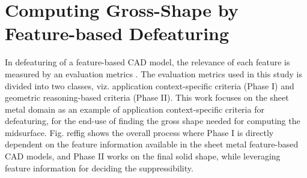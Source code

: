 \section{Computing Gross-Shape by Feature-based Defeaturing} \label{defeat}

In defeaturing of a feature-based CAD model, the relevance of each feature is measured by an evaluation metrics  \cite{AdskElectronicsHelp}.  The evaluation metrics used in this study is divided into two classes, viz. application context-specific criteria (Phase I) and geometric reasoning-based criteria (Phase II). This work focuses on the sheet metal domain as an example of application context-specific criteria for defeaturing, for the end-use of finding the gross shape needed for computing the midsurface. Fig. ref{fig} shows the overall process where Phase I is directly dependent on the feature information available in the sheet metal feature-based CAD models, and Phase II works on the final solid shape, while leveraging feature information for deciding the suppressibility.


